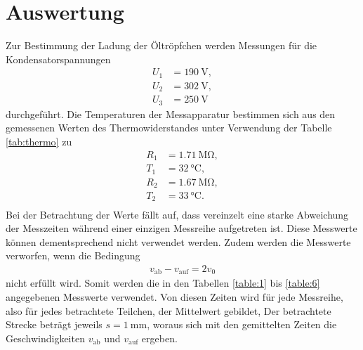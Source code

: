 \section{Auswertung}
\label{sec:Auswertung}

Zur Bestimmung der Ladung der Öltröpfchen werden Messungen für die Kondensatorspannungen
\begin{align*}
U_1 &= \SI{190}{\volt},\\
U_2 &= \SI{302}{\volt},\\
U_3 &= \SI{250}{\volt}
\end{align*}
durchgeführt.
Die Temperaturen der Messapparatur bestimmen sich aus den gemessenen Werten des Thermowiderstandes unter Verwendung der Tabelle \ref{tab:thermo} zu
\begin{align*}
R_1 &= \SI{1.71}{\mega\ohm},\\
T_1 &= \SI{32}{\celsius},\\
R_2 &= \SI{1.67}{\mega\ohm},\\
T_2 &= \SI{33}{\celsius}.\\
\end{align*}
Bei der Betrachtung der Werte fällt auf, dass vereinzelt eine starke Abweichung der Messzeiten während einer einzigen Messreihe aufgetreten ist.
Diese Messwerte können dementsprechend nicht verwendet werden.
Zudem werden die Messwerte verworfen, wenn die Bedingung
\begin{align*}
  v_{\text{ab}} - v_{\text{auf}} = 2 v_0
\end{align*}
nicht erfüllt wird.
Somit werden die in den Tabellen \ref{table:1} bis \ref{table:6} angegebenen Messwerte verwendet.
Von diesen Zeiten wird für jede Messreihe, also für jedes betrachtete Teilchen, der Mittelwert gebildet,
Der betrachtete Strecke beträgt jeweils $s = \SI{1}{\milli\metre}$, woraus sich mit den gemittelten Zeiten die Geschwindigkeiten $v_{\text{ab}}$ und $v_{\text{auf}}$ ergeben.












\clearpage

